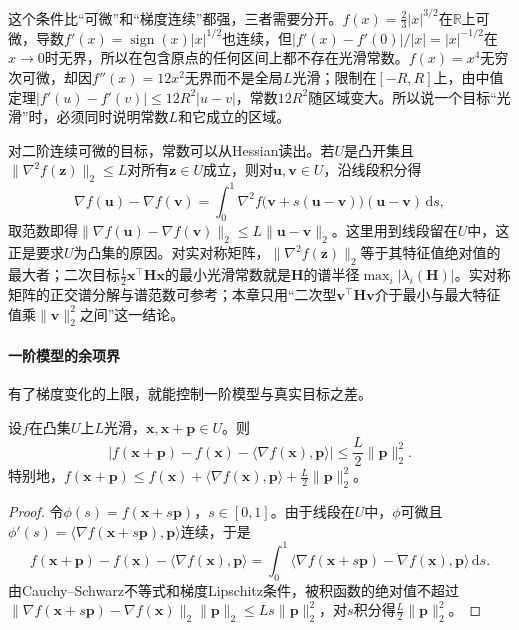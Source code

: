 这个条件比“可微”和“梯度连续”都强，三者需要分开。$f(x)=\tfrac23|x|^{3/2}$在$\mathbb R$上可微，导数$f'(x)=\operatorname{sign}(x)|x|^{1/2}$也连续，但$|f'(x)-f'(0)|/|x|=|x|^{-1/2}$在$x\to0$时无界，所以在包含原点的任何区间上都不存在光滑常数。$f(x)=x^4$无穷次可微，却因$f''(x)=12x^2$无界而不是全局$L$光滑；限制在$[-R,R]$上，由中值定理$|f'(u)-f'(v)|\leq12R^2|u-v|$，常数$12R^2$随区域变大。所以说一个目标“光滑”时，必须同时说明常数$L$和它成立的区域。

对二阶连续可微的目标，常数可以从Hessian读出。若$U$是凸开集且$\lVert\nabla^2f(\bm z)\rVert_2\leq L$对所有$\bm z\in U$成立，则对$\bm u,\bm v\in U$，沿线段积分得
\[
  \nabla f(\bm u)-\nabla f(\bm v)=\int_0^1\nabla^2f\bigl(\bm v+s(\bm u-\bm v)\bigr)(\bm u-\bm v)\,\mathrm ds,
\]
取范数即得$\lVert\nabla f(\bm u)-\nabla f(\bm v)\rVert_2\leq L\lVert\bm u-\bm v\rVert_2$。这里用到线段留在$U$中，这正是要求$U$为凸集的原因。对实对称矩阵，$\lVert\nabla^2f(\bm z)\rVert_2$等于其特征值绝对值的最大者；二次目标$\tfrac12\bm x^\top\bm H\bm x$的最小光滑常数就是$\bm H$的谱半径$\max_i|\lambda_i(\bm H)|$。实对称矩阵的正交谱分解与谱范数可参考；本章只用“二次型$\bm v^\top\bm H\bm v$介于最小与最大特征值乘$\lVert\bm v\rVert_2^2$之间”这一结论。

\paragraph{一阶模型的余项界}
有了梯度变化的上限，就能控制一阶模型与真实目标之差。

\begin{lemma}[下降引理]
\label{lem:opt-smooth-descent-lemma}
设$f$在凸集$U$上$L$光滑，$\bm x,\bm x+\bm p\in U$。则
\begin{equation}
\label{eq:opt-smooth-descent-lemma}
  \bigl|f(\bm x+\bm p)-f(\bm x)-\langle\nabla f(\bm x),\bm p\rangle\bigr|\leq\frac L2\lVert\bm p\rVert_2^2 .
\end{equation}
特别地，$f(\bm x+\bm p)\leq f(\bm x)+\langle\nabla f(\bm x),\bm p\rangle+\tfrac L2\lVert\bm p\rVert_2^2$。
\end{lemma}

\begin{proof}
令$\phi(s)=f(\bm x+s\bm p)$，$s\in[0,1]$。由于线段在$U$中，$\phi$可微且$\phi'(s)=\langle\nabla f(\bm x+s\bm p),\bm p\rangle$连续，于是
\[
  f(\bm x+\bm p)-f(\bm x)-\langle\nabla f(\bm x),\bm p\rangle
  =\int_0^1\bigl\langle\nabla f(\bm x+s\bm p)-\nabla f(\bm x),\bm p\bigr\rangle\,\mathrm ds .
\]
由Cauchy--Schwarz不等式和梯度Lipschitz条件，被积函数的绝对值不超过$\lVert\nabla f(\bm x+s\bm p)-\nabla f(\bm x)\rVert_2\lVert\bm p\rVert_2\leq Ls\lVert\bm p\rVert_2^2$，对$s$积分得$\tfrac L2\lVert\bm p\rVert_2^2$。
\end{proof}

